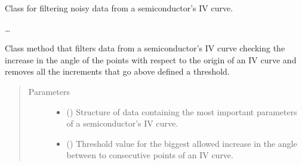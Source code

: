 \documentclass[letterpaper,10pt,english,openany, oneside]{sphinxmanual}
\begin{document}
\begin{fulllineitems}
\label{\detokenize{index:fompy.conditioning.filter_tool}}
Class for filtering noisy data from a semiconductor’s IV curve.

…

\begin{fulllineitems}
\label{\detokenize{index:fompy.conditioning.filter_tool.polar_filter}}
Class method that filters data from a semiconductor’s IV curve checking the increase in the angle
of the points with respect to the origin of an IV curve and removes all the increments that go above
defined a threshold.

\end{fulllineitems}

\begin{quote}\begin{description}
\item[{Parameters}] \leavevmode\begin{itemize}
\item {} 
 () \textendash{} Structure of data containing the most important parameters of a semiconductor’s IV curve.

\item {} 
 () \textendash{} Threshold value for the biggest allowed increase in the angle between to consecutive points
of an IV curve.

\end{itemize}

\end{description}\end{quote}

\end{fulllineitems}

\end{document}
